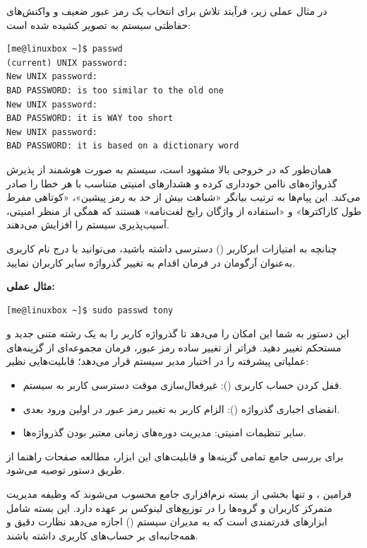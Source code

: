 در مثال عملی زیر، فرآیند تلاش برای انتخاب یک رمز عبور ضعیف و واکنش‌های حفاظتی سیستم به تصویر کشیده شده است:

\begin{latin}
\begin{lstlisting}
[me@linuxbox ~]$ passwd
(current) UNIX password:
New UNIX password:
BAD PASSWORD: is too similar to the old one
New UNIX password:
BAD PASSWORD: it is WAY too short
New UNIX password:
BAD PASSWORD: it is based on a dictionary word
\end{lstlisting}
\end{latin}

همان‌طور که در خروجی بالا مشهود است، سیستم به صورت هوشمند از پذیرش گذرواژه‌های ناامن خودداری کرده و هشدارهای امنیتی متناسب با هر خطا را صادر می‌کند. این پیام‌ها به ترتیب بیانگر «شباهت بیش از حد به رمز پیشین»، «کوتاهی مفرط طول کاراکترها» و «استفاده از واژگان رایج لغت‌نامه» هستند که همگی از منظر امنیتی، آسیب‌پذیری سیستم را افزایش می‌دهند.

چنانچه به امتیازات ابرکاربر () دسترسی داشته باشید، می‌توانید با درج نام کاربری به‌عنوان آرگومان در فرمان  اقدام به تغییر گذرواژه سایر کاربران نمایید.

\textbf{مثال عملی:}

\begin{latin}
\begin{lstlisting}
[me@linuxbox ~]$ sudo passwd tony
\end{lstlisting}
\end{latin}

این دستور به شما این امکان را می‌دهد تا گذرواژه کاربر  را به یک رشته متنی جدید و مستحکم تغییر دهید. فراتر از تغییر ساده رمز عبور، فرمان  مجموعه‌ای از گزینه‌های عملیاتی پیشرفته را در اختیار مدیر سیستم قرار می‌دهد؛ قابلیت‌هایی نظیر:

\begin{itemize}
  \item قفل کردن حساب کاربری (): غیرفعال‌سازی موقت دسترسی کاربر به سیستم.
  \item انقضای اجباری گذرواژه (): الزام کاربر به تغییر رمز عبور در اولین ورود بعدی.
  \item سایر تنظیمات امنیتی: مدیریت دوره‌های زمانی معتبر بودن گذرواژه‌ها.
\end{itemize}

برای بررسی جامع تمامی گزینه‌ها و قابلیت‌های این ابزار، مطالعه صفحات راهنما از طریق دستور  توصیه می‌شود.

فرامین ،  و  تنها بخشی از بسته نرم‌افزاری جامع  محسوب می‌شوند که وظیفه مدیریت متمرکز کاربران و گروه‌ها را در توزیع‌های لینوکس بر عهده دارد. این بسته شامل ابزارهای قدرتمندی است که به مدیران سیستم () اجازه می‌دهد نظارت دقیق و همه‌جانبه‌ای بر حساب‌های کاربری داشته باشند.

